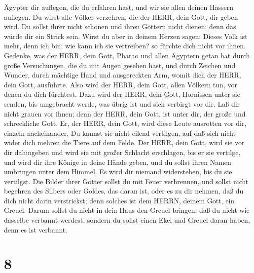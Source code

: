 Ägypter dir auflegen, die du erfahren hast, und wir sie allen deinen
Hassern auflegen.  Du wirst alle Völker verzehren, die der
HERR, dein Gott, dir geben wird. Du sollst ihrer nicht schonen und ihren
Göttern nicht dienen; denn das würde dir ein Strick sein. 
Wirst du aber in deinem Herzen sagen: Dieses Volk ist mehr, denn ich
bin; wie kann ich sie vertreiben?  so fürchte dich nicht
vor ihnen. Gedenke, was der HERR, dein Gott, Pharao und allen Ägyptern
getan hat  durch große Versuchungen, die du mit Augen
gesehen hast, und durch Zeichen und Wunder, durch mächtige Hand und
ausgereckten Arm, womit dich der HERR, dein Gott, ausführte. Also wird
der HERR, dein Gott, allen Völkern tun, vor denen du dich fürchtest.
 Dazu wird der HERR, dein Gott, Hornissen unter sie senden,
bis umgebracht werde, was übrig ist und sich verbirgt vor dir.
 Laß dir nicht grauen vor ihnen; denn der HERR, dein Gott,
ist unter dir, der große und schreckliche Gott.  Er, der
HERR, dein Gott, wird diese Leute ausrotten vor dir, einzeln
nacheinander. Du kannst sie nicht eilend vertilgen, auf daß sich nicht
wider dich mehren die Tiere auf dem Felde.  Der HERR, dein
Gott, wird sie vor dir dahingeben und wird sie mit großer Schlacht
erschlagen, bis er sie vertilge,  und wird dir ihre Könige
in deine Hände geben, und du sollst ihren Namen umbringen unter dem
Himmel. Es wird dir niemand widerstehen, bis du sie vertilgst.
 Die Bilder ihrer Götter sollst du mit Feuer verbrennen,
und sollst nicht begehren des Silbers oder Goldes, das daran ist, oder
es zu dir nehmen, daß du dich nicht darin verstrickst; denn solches ist
dem HERRN, deinem Gott, ein Greuel.  Darum sollst du nicht
in dein Haus den Greuel bringen, daß du nicht wie dasselbe verbannt
werdest; sondern du sollst einen Ekel und Greuel daran haben, denn es
ist verbannt.

\hypertarget{section-7}{%
\section{8}\label{section-7}}

